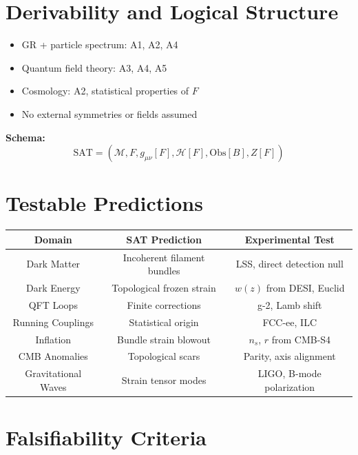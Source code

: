 \documentclass[11pt]{article}
\begin{document}
\section{Derivability and Logical Structure}

\begin{itemize}
  \item GR + particle spectrum: A1, A2, A4
  \item Quantum field theory: A3, A4, A5
  \item Cosmology: A2, statistical properties of \( F \)
  \item No external symmetries or fields assumed
\end{itemize}

\textbf{Schema:}
\[
\text{SAT} = (\mathcal{M}, F, g_{\mu\nu}[F], \mathcal{H}[F], \text{Obs}[B], Z[F])
\]

\section{Testable Predictions}

\begin{center}
\begin{tabular}{|c|c|c|}
\hline
Domain & SAT Prediction & Experimental Test \\\hline
Dark Matter & Incoherent filament bundles & LSS, direct detection null \\
Dark Energy & Topological frozen strain & $w(z)$ from DESI, Euclid \\
QFT Loops & Finite corrections & g-2, Lamb shift \\
Running Couplings & Statistical origin & FCC-ee, ILC \\
Inflation & Bundle strain blowout & $n_s$, $r$ from CMB-S4 \\
CMB Anomalies & Topological scars & Parity, axis alignment \\
Gravitational Waves & Strain tensor modes & LIGO, B-mode polarization \\\hline
\end{tabular}
\end{center}

\section{Falsifiability Criteria}
\end{document}
